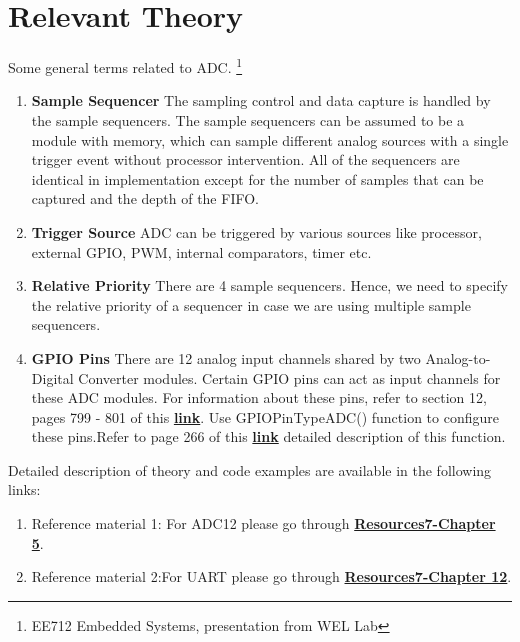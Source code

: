 \documentclass{article} %
\newcounter{source}
\newcounter{terms}
\begin{document}
\section {Relevant Theory}
Some general terms related to ADC.
\footnote{EE712 Embedded Systems, presentation from WEL Lab}
\begin{enumerate}
\item \textbf{Sample Sequencer}
The sampling control and data capture is handled by the sample sequencers.
The sample sequencers can be assumed to be a module with memory, which can sample different analog sources with a single trigger event without processor intervention.
All of the sequencers are identical in implementation except for the number of samples that can be captured and the depth of the FIFO.
\item \textbf{Trigger Source}
ADC can be triggered by various sources like processor, external GPIO, PWM, internal comparators, timer etc.
\item \textbf{Relative Priority}
There are 4 sample sequencers. Hence, we need to specify the relative priority of a sequencer in case we are using multiple sample sequencers.
\item \textbf{GPIO Pins}
There are 12 analog input channels shared by two Analog-to-Digital Converter modules. Certain GPIO pins can act as input channels for these ADC modules. For information about these pins, refer to section 12, pages 799 - 801 of this \href{http://www.ti.com/lit/ds/spms376e/spms376e.pdf}{\textbf{link}}. Use GPIOPinTypeADC() function to configure these pins.Refer to page 266 of this \href{http://www.ti.com/lit/ug/spmu298a/spmu298a.pdf}{\textbf{link}} detailed description of this function.
\end{enumerate}
Detailed description of theory and code examples are available in the following links:
\begin{enumerate}
\item Reference material 1: For ADC12 please go through \href{https://www.cse.iitb.ac.in/~erts/html_pages/Resources/Tiva/TM4C123G_LaunchPad_Workshop_Workbook.pdf}{\textbf{Resources7-Chapter 5}}.

\item Reference material 2:For UART please go through \href{https://www.cse.iitb.ac.in/~erts/html_pages/Resources/Tiva/TM4C123G_LaunchPad_Workshop_Workbook.pdf}{\textbf{Resources7-Chapter 12}}.
\end{enumerate}
\end{document}
